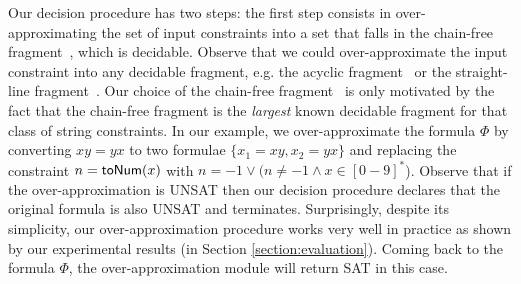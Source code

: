 \documentclass[sigplan,screen]{acmart}
\begin{document}
Our decision procedure has two steps: the first step consists in over-approximating the set of input constraints into a set that falls in the chain-free fragment~\cite{abdulla2019chain}, which is decidable. Observe that we could  over-approximate the input constraint into any decidable fragment, e.g. the acyclic fragment~\cite{abdulla2014string} or the straight-line fragment~\cite{chen2019decision}. Our choice of the  chain-free fragment~\cite{abdulla2019chain} is only motivated by the fact that the chain-free fragment is the {\em largest} known decidable fragment for that class of string constraints. In our example, we over-approximate the formula $\Phi$ by converting $xy=yx$ to two formulae $\{x_1=xy, x_2=yx\}$  and replacing the constraint $n=\mbox{\textsf{toNum}($x$)}$ with $n=-1 \vee (n\neq -1 \wedge x\in [0-9]^*$). 
Observe that if the over-approximation is UNSAT then our decision procedure  declares that the original formula is also UNSAT and terminates. Surprisingly, despite its simplicity, our over-approximation procedure works very well in practice as shown by our experimental results  (in Section \ref{section:evaluation}). Coming back to the formula $\Phi$, the over-approximation module will  return SAT  in this case. 
\end{document}
